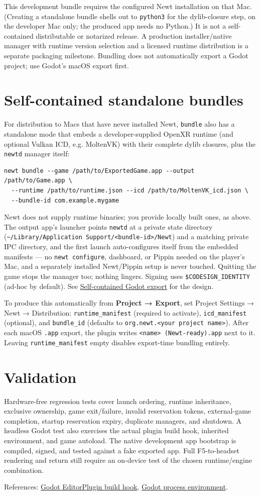 \documentclass[11pt]{article}
\begin{document}
This development bundle requires the configured Newt installation on that Mac. (Creating a standalone bundle shells out to \texttt{python3} for the dylib-closure step, on the developer Mac only; the produced app needs no Python.) It is not a self-contained distributable or notarized release. A production installer/native manager with runtime version selection and a licensed runtime distribution is a separate packaging milestone. Bundling does not automatically export a Godot project; use Godot's macOS export first.
\section{Self-contained standalone bundles}
\label{sec:orgf96f219}
For distribution to Macs that have never installed Newt, \texttt{bundle} also has a standalone mode that embeds a developer-supplied OpenXR runtime (and optional Vulkan ICD, e.g. MoltenVK) with their complete dylib closures, plus the \texttt{newtd} manager itself:
\begin{verbatim}
newt bundle --game /path/to/ExportedGame.app --output /path/to/Game.app \
  --runtime /path/to/runtime.json --icd /path/to/MoltenVK_icd.json \
  --bundle-id com.example.mygame
\end{verbatim}
Newt does not supply runtime binaries; you provide locally built ones, as above. The output app's launcher points \texttt{newtd} at a private state directory (\texttt{\textasciitilde{}/Library/Application Support/<bundle-id>/Newt}) and a matching private IPC directory, and the first launch auto-configures itself from the embedded manifests — no \texttt{newt configure}, dashboard, or Pippin needed on the player's Mac, and a separately installed Newt/Pippin setup is never touched. Quitting the game stops the manager too; nothing lingers. Signing uses \texttt{\$CODESIGN\_IDENTITY} (ad-hoc by default). See \href{../../docs/GODOT-STANDALONE-EXPORT.md}{Self-contained Godot export} for the design.

To produce this automatically from \textbf{Project → Export}, set Project Settings → Newt → Distribution: \texttt{runtime\_manifest} (required to activate), \texttt{icd\_manifest} (optional), and \texttt{bundle\_id} (defaults to \texttt{org.newt.<your project name>}). After each macOS \texttt{.app} export, the plugin writes \texttt{<name> (Newt-ready).app} next to it. Leaving \texttt{runtime\_manifest} empty disables export-time bundling entirely.
\section{Validation}
\label{sec:org802d7de}
Hardware-free regression tests cover launch ordering, runtime inheritance, exclusive ownership, game exit/failure, invalid reservation tokens, external-game completion, startup reservation expiry, duplicate managers, and shutdown. A headless Godot test also exercises the actual plugin build hook, inherited environment, and game autoload. The native development app bootstrap is compiled, signed, and tested against a fake exported app. Full F5-to-headset rendering and return still require an on-device test of the chosen runtime/engine combination.

References: \href{https://docs.godotengine.org/en/4.4/classes/class\_editorplugin.html\#class-editorplugin-private-method-build}{Godot EditorPlugin build hook}, \href{https://docs.godotengine.org/en/4.4/classes/class\_os.html\#class-os-method-set-environment}{Godot process environment}.
\end{document}

